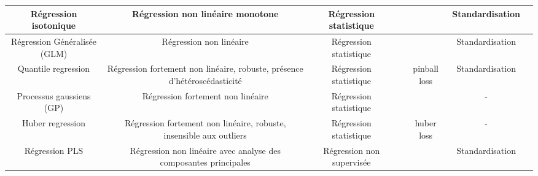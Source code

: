 \begin{table}[h!]
\begin{tabularx}{\textwidth}{|C|C|C|C|C|C|C|}
Régression isotonique                              & Régression non linéaire monotone                                                          & Régression statistique               &                                                                                 &                                                                                                    & Standardisation \\
\hline

Régression Généralisée (GLM)                       & Régression non linéaire                                                                   & Régression statistique               &                                                                                 &                                                                                                    & Standardisation \\
\hline

Quantile regression                                & Régression fortement non linéaire, robuste, présence d'hétéroscédasticité                 & Régression statistique               &                                                                                 & pinball loss                                                                                       & Standardisation \\
\hline

Processus gaussiens (GP)                           & Régression fortement non linéaire                                                         & Régression statistique               &                                                                                 &                                                                                                    & - \\
\hline

Huber regression                                   & Régression fortement non linéaire, robuste, insensible aux outliers                       & Régression statistique               &                                                                                 & huber loss                                                                                         & - \\
\hline

Régression PLS                                     & Régression non linéaire avec analyse des composantes principales                          & Régression non supervisée            &                                                                                 &                                                                                                    & Standardisation \\
\hline


\end{tabularx}
\end{table}
